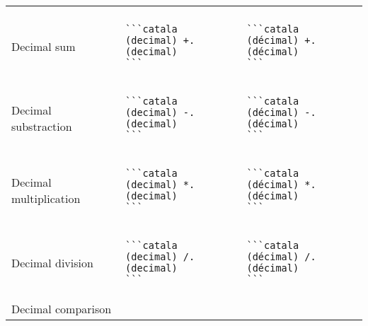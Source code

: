 \documentclass[a3paper,landscape]{article}
\begin{document}
\begin{multicols*}{2}
\begin{center}
\begin{tabular}{p{}p{}p{}}
\vspace*{-1.75em}
\\
Decimal sum&
\vspace*{-1.75em}
\begin{verbatim}
```catala
(decimal) +. (decimal)
```
\end{verbatim}
\vspace*{-1.75em}
&
\vspace*{-1.75em}
\begin{verbatim}
```catala
(décimal) +. (décimal)
```
\end{verbatim}
\vspace*{-1.75em}
\\
Decimal substraction&
\vspace*{-1.75em}
\begin{verbatim}
```catala
(decimal) -. (decimal)
```
\end{verbatim}
\vspace*{-1.75em}
&
\vspace*{-1.75em}
\begin{verbatim}
```catala
(décimal) -. (décimal)
```
\end{verbatim}
\vspace*{-1.75em}
\\
Decimal multiplication&
\vspace*{-1.75em}
\begin{verbatim}
```catala
(decimal) *. (decimal)
```
\end{verbatim}
\vspace*{-1.75em}
&
\vspace*{-1.75em}
\begin{verbatim}
```catala
(décimal) *. (décimal)
```
\end{verbatim}
\vspace*{-1.75em}
\\
Decimal division&
\vspace*{-1.75em}
\begin{verbatim}
```catala
(decimal) /. (decimal)
```
\end{verbatim}
\vspace*{-1.75em}
&
\vspace*{-1.75em}
\begin{verbatim}
```catala
(décimal) /. (décimal)
```
\end{verbatim}
\vspace*{-1.75em}
\\
Decimal comparison&
\vspace*{-1.75em}

\end{tabular}
\end{center}
\end{multicols*}
\end{document}
